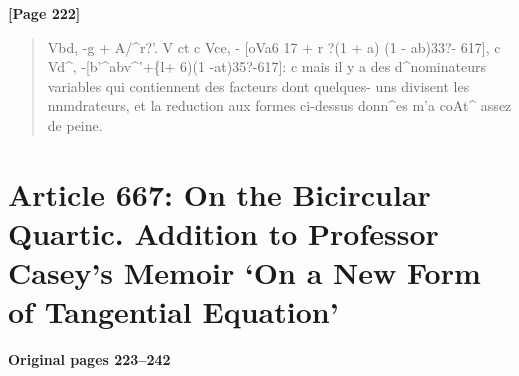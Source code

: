 \documentclass[11pt,a4paper]{book}
\begin{document}
\textbf{[Page 222]}\\[0.2cm]
\begin{quote}
Vbd, -g + A/\textasciicircum{}r?'.
V
ct
c
Vce, - [oVa6 17 + r ?(1 + a) (1 - ab)33?- 617],
c
Vd\textasciicircum{}, -[b'\textasciicircum{}abv\textasciicircum{}'+\{l+ 6)(1 -at)35?-617]:
c
mais il y a des d\textasciicircum{}nominateurs variables qui contiennent des facteurs dont quelques-
uns divisent les nnmdrateurs, et la reduction aux formes ci-dessus donn\textasciicircum{}es m'a
coAt\textasciicircum{} assez de peine.
\end{quote}

\newpage

\section*{Article 667: On the Bicircular Quartic. Addition to Professor Casey's Memoir `On a New Form of Tangential Equation'}
\textbf{Original pages 223--242}\\[0.3cm]
\end{document}
